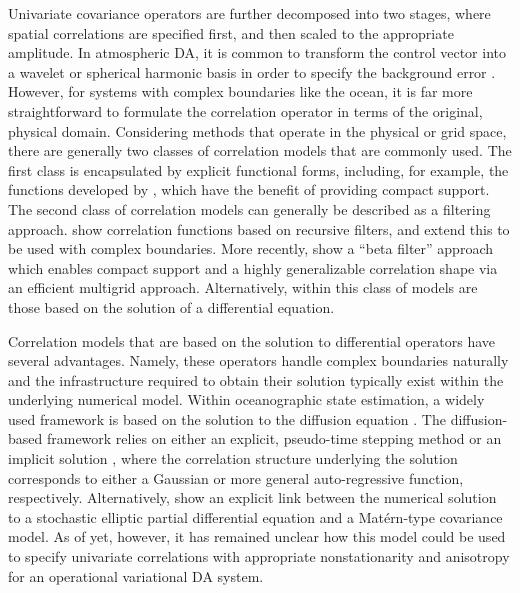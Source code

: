 Univariate covariance operators are further decomposed into two stages, where spatial
correlations are specified first, and then scaled to the appropriate amplitude.
In atmospheric DA, it is common to transform the control vector
into a wavelet or spherical harmonic basis in order to specify the background
error \citep[e.g.][]{bannister_review_2008-2}.
However, for systems with complex boundaries like the ocean, it is far more
straightforward to formulate the correlation operator in terms of the original,
physical domain.
Considering methods that operate in the physical or grid space, there are
generally two classes of correlation models that are commonly used.
The first class is encapsulated by explicit functional forms, including, for
example, the functions developed by
\citet{gaspari_construction_1999,gneiting_correlation_1999,gaspari_construction_2006},
which have the benefit of providing compact support.
The second class of correlation models can generally be described as a filtering
approach.
\citet{purser_numerical_2003-2,purser_numerical_2003-1}
show correlation functions based on recursive filters, and
\citet{dobricic_oceanographic_2008} extend this to be used with complex boundaries.
More recently, \citet{purser_multigrid_2022} show a ``beta
filter'' approach which enables compact support and a highly generalizable
correlation shape via an efficient multigrid approach.
Alternatively, within this class of models are those based on the solution of a
differential equation.

Correlation models that are based on the solution to differential operators have
several advantages.
Namely, these operators handle complex boundaries naturally and the
infrastructure required to obtain their solution typically exist within
the underlying numerical model.
Within oceanographic state estimation, a widely used framework is based on the
solution to the diffusion equation
\citep[e.g.][]{nguyen_arctic_2021,forgetECCOv4,blockley_recent_2014,moore_regional_2011-1,daget_ensemble_2009,muccino_inverse_2008,di_lorenzo_weak_2007,weaver_three-_2003}.
The diffusion-based framework relies on either an explicit, pseudo-time stepping
method \citep{weaver_correlation_2001} or an implicit solution
\citep{mirouze_representation_2010,carrier_background-error_2010,weaver_diffusion_2013},
where the correlation structure underlying the solution corresponds to either a
Gaussian or more general auto-regressive function, respectively.
Alternatively, \citet{RSSB:RSSB777} show an explicit link between the numerical solution
to a stochastic elliptic partial differential equation and a Mat\'ern-type covariance
model.
As of yet, however, it has remained unclear how this model could be used to
specify univariate correlations with appropriate nonstationarity and anisotropy
for an operational variational DA system.

